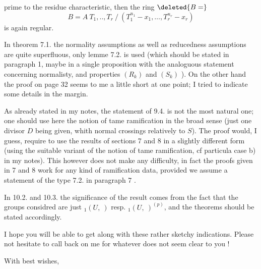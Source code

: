 prime to the residue characteristic, then the ring $\deleted{B=}$
\[
B=A\ T_1,..,T_r\ /\ (T_1^{n_1}-x_1,\ldots,T_r^{n_r}-x_r)
\]
is again regular.

In theorem 7.1. the normality assumptions as well as reducedness assumptions are quite superfluous, only lemme 7.2. is used (which should be stated in paragraph 1, maybe in a single proposition with the analoguous statement concerning normalisty, and properties $(R_k)$ and $(S_k)$ ). On the other hand the proof on page 32 seems to me  a little short at one point; I tried to indicate some details in the margin.

As already stated in my notes, the statement of 9.4. is not the most natural one; one should use here the notion of tame ramification in the broad sense (just one divisor $D$ being given, whith normal crossings relatively to $S$).  The proof would, I guess, require to use the results of sections 7 and 8 in a slightly different form (using the suitable variant of the notion of tame ramification, cf  particula
case b) in my notes). This however does not make any difficulty, in fact the proofs given in 7 and 8 work for any kind of ramification data, provided we assume a statement of the type 7.2. in paragraph 7 .

In 10.2. and 10.3. the significance of the result comes from the fact that the groups considred are just ${}_1(U,\ )$ resp. ${}_1(U,\ )^{(p)}$, and the theorems should be stated accordingly.

I hope you will be able to get along with these rather sketchy indications. Please  not hesitate to call back on me for whatever does not seem clear to you !

With best wishes,\\
